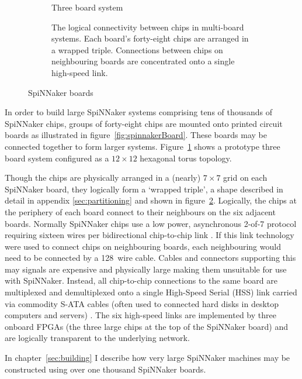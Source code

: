 \begin{figure}
\begin{subfigure}[b]{0.45\linewidth}
				\caption{Three board system}
				\label{fig:threeboard}
			\end{subfigure}
			
			\vspace*{2em}
			
			\begin{subfigure}{\linewidth}
				\center
				
				\caption{The logical connectivity between chips in multi-board systems.
				Each board's forty-eight chips are arranged in a wrapped triple.
				Connections between chips on neighbouring boards are concentrated onto
				a single high-speed link.}
				\label{fig:sata-connections}
			\end{subfigure}
			
			\caption{SpiNNaker boards}
			\label{fig:spinnaker-boards}
		\end{figure}
		
		In order to build large SpiNNaker systems comprising tens of thousands of
		SpiNNaker chips, groups of forty-eight chips are mounted onto printed
		circuit boards as illustrated in figure~\ref{fig:spinnakerBoard}. These
		boards may be connected together to form larger systems.
		Figure~\ref{fig:threeboard} shows a prototype three board system configured
		as a $12\times12$ hexagonal torus topology.
		
		Though the chips are physically arranged in a (nearly) $7\times7$ grid on
		each SpiNNaker board, they logically form a `wrapped triple', a shape
		described in detail in appendix \ref{sec:partitioning} and shown in
		figure~\ref{fig:sata-connections}. Logically, the chips at the periphery of
		each board connect to their neighbours on the six adjacent boards.
		Normally SpiNNaker chips use a low power, asynchronous 2-of-7 protocol
		requiring sixteen wires per bidirectional chip-to-chip link
		\cite{bainbridge03}. If this link technology were used to connect chips on
		neighbouring boards, each neighbouring would need to be connected by a
		128~wire cable. Cables and connectors supporting this may signals are
		expensive and physically large making them unsuitable for use with
		SpiNNaker. Instead, all chip-to-chip connections to the same board are
		multiplexed and demultiplexed onto a single High-Speed Serial (HSS) link
		\cite{athavale05} carried via commodity S-ATA cables (often used to
		connected hard disks in desktop computers and servers) \cite{sata3spec}.
		The six high-speed links are implemented by three onboard FPGAs (the three
		large chips at the top of the SpiNNaker board) and are logically
		transparent to the underlying network.
		
		In chapter~\ref{sec:building} I describe how very large SpiNNaker machines
		may be constructed using over one thousand SpiNNaker boards.
